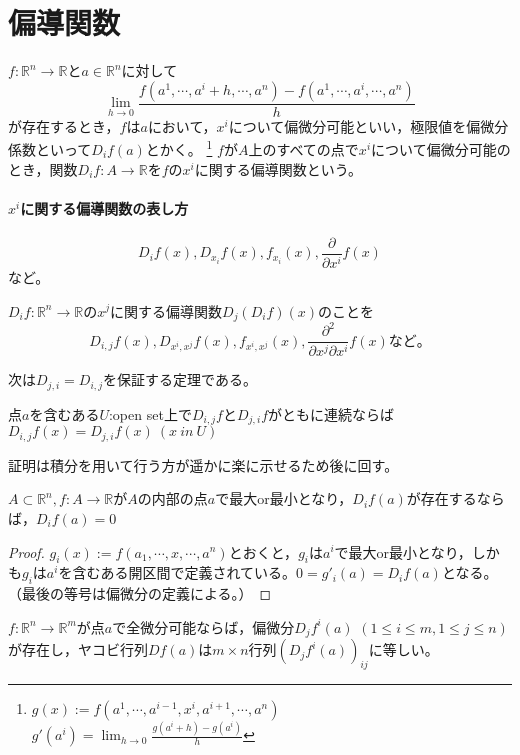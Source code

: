 \section{偏導関数}
$f:\mathbb{R}^n\to\mathbb{R}$と$a\in\mathbb{R}^n$に対して
\[
\lim_{h\to0}\frac{f(a^1,\cdots,a^i+h,\cdots,a^n)-f(a^1,\cdots,a^i,\cdots,a^n)}{h}
\]
が存在するとき，$f$は$a$において，$x^i$について偏微分可能といい，極限値を偏微分係数といって$D_if(a)$とかく。
\footnote{
$g(x):=f(a^1,\cdots,a^{i-1},x^i,a^{i+1},\cdots,a^n)$\\
$g'(a^i)=\lim_{h\to0}\frac{g(a^i+h)-g(a^i)}{h}$
}
$f$が$A$上のすべての点で$x^i$について偏微分可能のとき，関数$D_if:A\to\mathbb{R}$を$f$の$x^i$に関する偏導関数という。
\paragraph{$x^i$に関する偏導関数の表し方}
\[
D_if(x),D_{x_i}f(x),f_{x_i}(x),\frac{\partial}{\partial x^i}f(x)
\]
など。

$D_if:\mathbb{R}^n\to\mathbb{R}$の$x^j$に関する偏導関数$D_j(D_if)(x)$のことを
\[
D_{i,j}f(x),D_{x^i,x^j}f(x),f_{x^i,x^j}(x),\frac{\partial^2}{\partial x^j \partial x^i}f(x)
など。
\]

次は$D_{j,i}=D_{i,j}$を保証する定理である。
\begin{framed}
	\begin{thm}\label{th2.5}
		点$a$を含むある$U$:open set上で$D_{i,j}f$と$D_{j,i}f$がともに連続ならば$D_{i,j}f(x)=D_{j,i}f(x)\ (x\ in\ U)$
	\end{thm}
\end{framed}
\begin{note}
証明は積分を用いて行う方が遥かに楽に示せるため後に回す。
\end{note}

\begin{framed}
	\begin{thm}\label{th2.6}
		$A\subset\mathbb{R}^n,f:A\to\mathbb{R}$が$A$の内部の点$a$で最大or最小となり，$D_if(a)$が存在するならば，$D_if(a)=0$
	\end{thm}
\end{framed}

\begin{proof}
	$g_i(x):=f(a_1,\cdots,x,\cdots,a^n)$とおくと，$g_i$は$a^i$で最大or最小となり，しかも$g_i$は$a^i$を含むある開区間で定義されている。$0=g'_i(a)=D_if(a)$となる。	（最後の等号は偏微分の定義による。）
\end{proof}

\begin{framed}
	\begin{thm}
		$f:\mathbb{R}^n\to\mathbb{R}^m$が点$a$で全微分可能ならば，偏微分$D_jf^i(a)$ $(1\leq i \leq m,1\leq j \leq n)$が存在し，ヤコビ行列$Df(a)$は$m\times n$行列$(D_jf^i(a))_{ij}$に等しい。
	\end{thm}
\end{framed}

